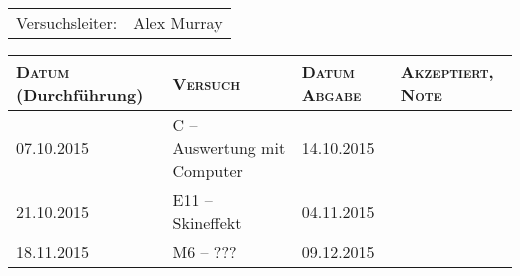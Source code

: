 \begin{titlepage}

    \maketitle

    \vspace{10mm}
    \begin{center}
    \begin{tabular}{lr}
        \Huge{Versuchsleiter:} & \Huge{Alex Murray} \\
    \end{tabular}

    \vspace{20mm}

    \Large
    \begin{tabular}{p{27mm}|p{67mm}|p{23mm}|p{26mm}}
        \textsc{Datum} \small (Durchf\"uhrung) & \textsc{Versuch} & \textsc{Datum Abgabe} & \textsc{Akzeptiert, Note} \\
        [10mm]
        \hline
        07.10.2015 & C -- Auswertung mit Computer & 14.10.2015 & \\
        [10mm]
        21.10.2015 & E11 -- Skineffekt            & 04.11.2015 & \\
        [10mm]
        18.11.2015 & M6 -- ???                    & 09.12.2015 & \\

    \end{tabular}
    \end{center}
    \normalsize

\end{titlepage}

